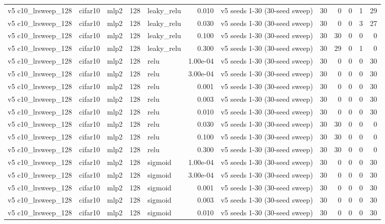 \begin{table}[htbp]
{\begin{tabular}{@{}lllrlrlrrrrr@{}}
v5 c10\_lrsweep\_128 & cifar10 & mlp2 & 128 & leaky\_relu & 0.010 & v5 seeds 1-30 (30-seed sweep) & 30 & 0 & 0 & 1 & 29 \\
v5 c10\_lrsweep\_128 & cifar10 & mlp2 & 128 & leaky\_relu & 0.030 & v5 seeds 1-30 (30-seed sweep) & 30 & 0 & 0 & 3 & 27 \\
v5 c10\_lrsweep\_128 & cifar10 & mlp2 & 128 & leaky\_relu & 0.100 & v5 seeds 1-30 (30-seed sweep) & 30 & 30 & 0 & 0 & 0 \\
v5 c10\_lrsweep\_128 & cifar10 & mlp2 & 128 & leaky\_relu & 0.300 & v5 seeds 1-30 (30-seed sweep) & 30 & 29 & 0 & 1 & 0 \\
v5 c10\_lrsweep\_128 & cifar10 & mlp2 & 128 & relu & 1.00e-04 & v5 seeds 1-30 (30-seed sweep) & 30 & 0 & 0 & 0 & 30 \\
v5 c10\_lrsweep\_128 & cifar10 & mlp2 & 128 & relu & 3.00e-04 & v5 seeds 1-30 (30-seed sweep) & 30 & 0 & 0 & 0 & 30 \\
v5 c10\_lrsweep\_128 & cifar10 & mlp2 & 128 & relu & 0.001 & v5 seeds 1-30 (30-seed sweep) & 30 & 0 & 0 & 0 & 30 \\
v5 c10\_lrsweep\_128 & cifar10 & mlp2 & 128 & relu & 0.003 & v5 seeds 1-30 (30-seed sweep) & 30 & 0 & 0 & 0 & 30 \\
v5 c10\_lrsweep\_128 & cifar10 & mlp2 & 128 & relu & 0.010 & v5 seeds 1-30 (30-seed sweep) & 30 & 0 & 0 & 0 & 30 \\
v5 c10\_lrsweep\_128 & cifar10 & mlp2 & 128 & relu & 0.030 & v5 seeds 1-30 (30-seed sweep) & 30 & 30 & 0 & 0 & 0 \\
v5 c10\_lrsweep\_128 & cifar10 & mlp2 & 128 & relu & 0.100 & v5 seeds 1-30 (30-seed sweep) & 30 & 30 & 0 & 0 & 0 \\
v5 c10\_lrsweep\_128 & cifar10 & mlp2 & 128 & relu & 0.300 & v5 seeds 1-30 (30-seed sweep) & 30 & 30 & 0 & 0 & 0 \\
v5 c10\_lrsweep\_128 & cifar10 & mlp2 & 128 & sigmoid & 1.00e-04 & v5 seeds 1-30 (30-seed sweep) & 30 & 0 & 0 & 0 & 30 \\
v5 c10\_lrsweep\_128 & cifar10 & mlp2 & 128 & sigmoid & 3.00e-04 & v5 seeds 1-30 (30-seed sweep) & 30 & 0 & 0 & 0 & 30 \\
v5 c10\_lrsweep\_128 & cifar10 & mlp2 & 128 & sigmoid & 0.001 & v5 seeds 1-30 (30-seed sweep) & 30 & 0 & 0 & 0 & 30 \\
v5 c10\_lrsweep\_128 & cifar10 & mlp2 & 128 & sigmoid & 0.003 & v5 seeds 1-30 (30-seed sweep) & 30 & 0 & 0 & 0 & 30 \\
v5 c10\_lrsweep\_128 & cifar10 & mlp2 & 128 & sigmoid & 0.010 & v5 seeds 1-30 (30-seed sweep) & 30 & 0 & 0 & 0 & 30 \\

\end{tabular}}
\end{table}
